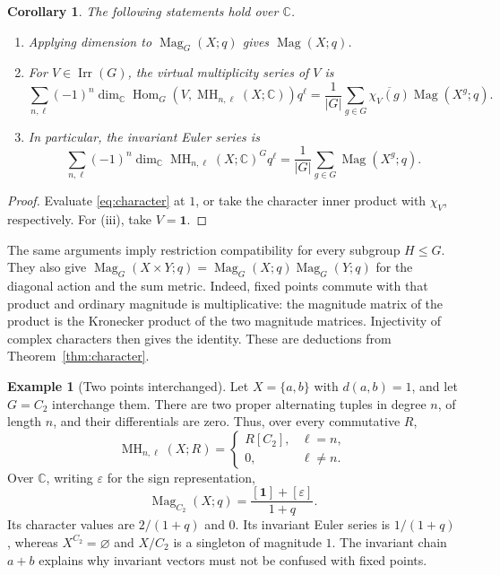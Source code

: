 \documentclass[11pt,a4paper]{article}
\numberwithin{equation}{section}
\newtheorem{corollary}[theorem]{Corollary}
\theoremstyle{definition}
\newtheorem{example}[theorem]{Example}
\theoremstyle{remark}
\newcommand{\C}{\mathbb C}
\newcommand{\G}{G}
\newcommand{\MH}{\operatorname{MH}}
\newcommand{\Mag}{\operatorname{Mag}}
\newcommand{\Hom}{\operatorname{Hom}}
\newcommand{\Irr}{\operatorname{Irr}}
\newcommand{\one}{\mathbf 1}
\begin{document}
\begin{corollary}\label{cor:rep-specializations}
 The following statements hold over $\C$.
 \begin{enumerate}[label=(\roman*)]
 \item Applying dimension to $\Mag_\G(X;q)$ gives $\Mag(X;q)$.
 \item For $V\in\Irr(\G)$, the virtual multiplicity series of $V$ is
 \begin{equation}\label{eq:character-multiplicity}
  \sum_{n,\ell}(-1)^n
    \dim_\C\Hom_\G(V,\MH_{n,\ell}(X;\C))q^\ell
  =\frac1{|\G|}\sum_{g\in\G}\overline{\chi_V(g)}\Mag(X^g;q).
 \end{equation}
 \item In particular, the invariant Euler series is
 \begin{equation}\label{eq:averaged-mag}
  \sum_{n,\ell}(-1)^n\dim_\C\MH_{n,\ell}(X;\C)^\G q^\ell
  =\frac1{|\G|}\sum_{g\in\G}\Mag(X^g;q).
 \end{equation}
 \end{enumerate}
\end{corollary}
\begin{proof}
Evaluate \eqref{eq:character} at $1$, or take the character inner product
with $\chi_V$, respectively.  For (iii), take $V=\one$.
\end{proof}

The same arguments imply restriction compatibility for every subgroup
$H\leq\G$.  They also give
$\Mag_\G(X\times Y;q)=\Mag_\G(X;q)\Mag_\G(Y;q)$ for the diagonal
action and the sum metric.  Indeed, fixed points commute with that
product and ordinary magnitude is multiplicative: the magnitude
matrix of the product is the Kronecker product of the two magnitude
matrices.  Injectivity of complex characters then gives the identity.
These are deductions from Theorem~\ref{thm:character}.

\begin{example}[Two points interchanged]\label{ex:two-points}
Let $X=\{a,b\}$ with $d(a,b)=1$, and let $\G=C_2$ interchange them.
There are two proper alternating tuples in degree $n$, of length $n$,
and their differentials are zero.  Thus, over every commutative $R$,
\[
 \MH_{n,\ell}(X;R)=
 \begin{cases}R[C_2],&\ell=n,\\0,&\ell\ne n.\end{cases}
\]
Over $\C$, writing $\varepsilon$ for the sign representation,
\[
 \Mag_{C_2}(X;q)=\frac{[\one]+[\varepsilon]}{1+q}.
\]
Its character values are $2/(1+q)$ and $0$.  Its invariant Euler series
is $1/(1+q)$, whereas $X^{C_2}=\varnothing$ and $X/C_2$ is a singleton
of magnitude $1$.  The invariant chain $a+b$ explains why invariant
vectors must not be confused with fixed points.
\end{example}
\end{document}
